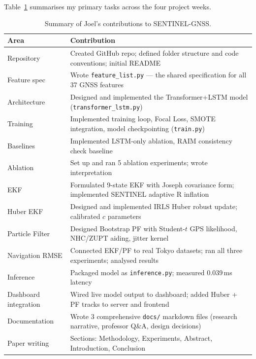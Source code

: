 \documentclass[12pt,a4paper]{article}
\begin{document}
Table~\ref{tab:contributions} summarises my primary tasks across the four project weeks.

\begin{table}[H]
  \centering
  \caption{Summary of Joel's contributions to SENTINEL-GNSS.}
  \label{tab:contributions}
  \begin{tabularx}{\textwidth}{lX}
    \toprule
    \textbf{Area} & \textbf{Contribution} \\
    \midrule
    Repository & Created GitHub repo; defined folder structure and code conventions; initial README \\
    Feature spec & Wrote \texttt{feature\_list.py} — the shared specification for all 37 GNSS features \\
    Architecture & Designed and implemented the Transformer+LSTM model (\texttt{transformer\_lstm.py}) \\
    Training & Implemented training loop, Focal Loss, SMOTE integration, model checkpointing (\texttt{train.py}) \\
    Baselines & Implemented LSTM-only ablation, RAIM consistency check baseline \\
    Ablation & Set up and ran 5 ablation experiments; wrote interpretation \\
    EKF & Formulated 9-state EKF with Joseph covariance form; implemented SENTINEL adaptive R inflation \\
    Huber EKF & Designed and implemented IRLS Huber robust update; calibrated $c$ parameters \\
    Particle Filter & Designed Bootstrap PF with Student-$t$ GPS likelihood, NHC/ZUPT aiding, jitter kernel \\
    Navigation RMSE & Connected EKF/PF to real Tokyo datasets; ran all three experiments; analysed results \\
    Inference & Packaged model as \texttt{inference.py}; measured 0.039\,ms latency \\
    Dashboard integration & Wired live model output to dashboard; added Huber + PF tracks to server and frontend \\
    Documentation & Wrote 3 comprehensive \texttt{docs/} markdown files (research narrative, professor Q\&A,
                    design decisions) \\
    Paper writing & Sections: Methodology, Experiments, Abstract, Introduction, Conclusion \\
    \bottomrule
  \end{tabularx}
\end{table}
\end{document}
